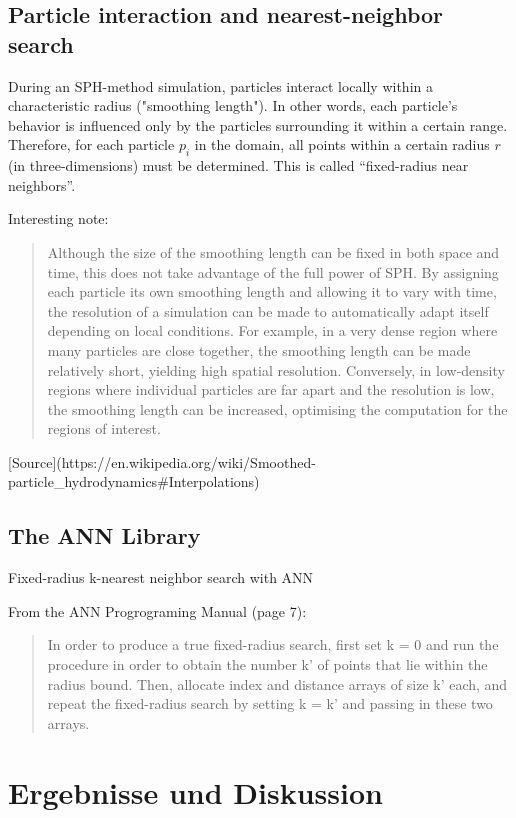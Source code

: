 \section{Particle interaction and nearest-neighbor search}
During an SPH-method simulation, particles interact locally within a characteristic radius ("smoothing length"). In other words, each particle's behavior is influenced only by the particles surrounding it within a certain range. Therefore, for each particle $p_i$ in the domain, all points within a certain radius $r$ (in three-dimensions) must be determined. This is called ``fixed-radius near neighbors''.

Interesting note:
\begin{quote}
  Although the size of the smoothing length can be fixed in both space and time, this does not take advantage of the full power of SPH. By assigning each particle its own smoothing length and allowing it to vary with time, the resolution of a simulation can be made to automatically adapt itself depending on local conditions. For example, in a very dense region where many particles are close together, the smoothing length can be made relatively short, yielding high spatial resolution. Conversely, in low-density regions where individual particles are far apart and the resolution is low, the smoothing length can be increased, optimising the computation for the regions of interest.
\end{quote}
[Source](https://en.wikipedia.org/wiki/Smoothed-particle_hydrodynamics#Interpolations)


\section{The ANN Library}


Fixed-radius k-nearest neighbor search with ANN

From the ANN Progrograming Manual (page 7):
\begin{quote}
  In order to produce a true fixed-radius search,  first set k = 0 and run the procedure in order to obtain the number k' of points that lie within the radius bound. Then, allocate index and distance arrays of size k' each, and repeat the fixed-radius search by setting k = k' and passing in these two arrays.
\end{quote}


\chapter{Ergebnisse und Diskussion}


